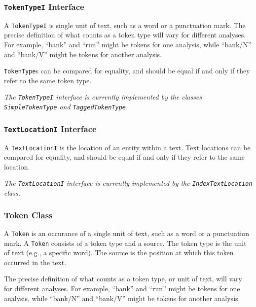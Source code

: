 \documentclass{article}
\begin{document}
\subsubsection{\texttt{TokenTypeI} Interface}

    A \texttt{TokenTypeI} is single unit of text, such as a word or a
    punctuation mark.  The precise definition of what counts as a token
    type will vary for different analyses.  For example, ``bank'' and
    ``run'' might be tokens for one analysis, while ``bank/N'' and
    ``bank/V'' might be tokens for another analysis.

    \texttt{TokenType}s can be compared for equality, and should be
    equal if and only if they refer to the same token type.

\vspace{2mm}\noindent
\textit{The \texttt{TokenTypeI} interface is currently implemented by
the classes \texttt{SimpleTokenType} and \texttt{TaggedTokenType}.}

\subsubsection{\texttt{TextLocationI} Interface}

    A \texttt{TextLocationI} is the location of an entity within a
    text.  Text locations can be compared for equality, and should be
    equal if and only if they refer to the same location.

\vspace{2mm}\noindent
\textit{The \texttt{TextLocationI} interface is currently implemented
by the \texttt{IndexTextLocation} class.}

\subsubsection{Token Class}

    A \texttt{Token} is an occurance of a single unit of text, such as
    a word or a punctuation mark.  A \texttt{Token} consists of a token type
    and a source.  The token type is the unit of text (e.g., a
    specific word).  The source is the position at which this token
    occurred in the text.

    The precise definition of what counts as a token type, or unit of
    text, will vary for different analyses.  For example, ``bank'' and 
    ``run'' might be tokens for one analysis, while ``bank/N'' and
    ``bank/V'' might be tokens for another analysis.
\end{document}
